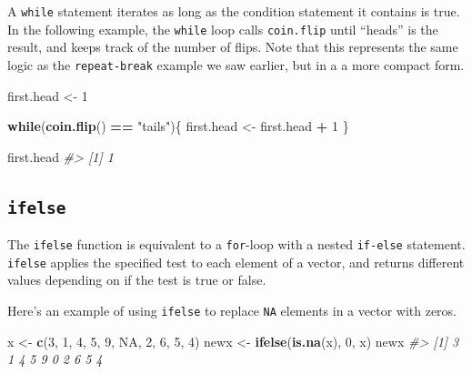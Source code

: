\documentclass[]{book}
\newenvironment{Shaded}{\begin{snugshade}}{\end{snugshade}}
\newcommand{\CommentTok}[1]{\textcolor[rgb]{0.56,0.35,0.01}{\textit{#1}}}
\newcommand{\ControlFlowTok}[1]{\textcolor[rgb]{0.13,0.29,0.53}{\textbf{#1}}}
\newcommand{\DecValTok}[1]{\textcolor[rgb]{0.00,0.00,0.81}{#1}}
\newcommand{\KeywordTok}[1]{\textcolor[rgb]{0.13,0.29,0.53}{\textbf{#1}}}
\newcommand{\NormalTok}[1]{#1}
\newcommand{\OperatorTok}[1]{\textcolor[rgb]{0.81,0.36,0.00}{\textbf{#1}}}
\newcommand{\OtherTok}[1]{\textcolor[rgb]{0.56,0.35,0.01}{#1}}
\newcommand{\StringTok}[1]{\textcolor[rgb]{0.31,0.60,0.02}{#1}}
\theoremstyle{definition}
\theoremstyle{definition}
\theoremstyle{definition}
\theoremstyle{remark}
\begin{document}
A \texttt{while} statement iterates as long as the condition statement
it contains is true. In the following example, the \texttt{while} loop
calls \texttt{coin.flip} until ``heads'' is the result, and keeps track
of the number of flips. Note that this represents the same logic as the
\texttt{repeat-break} example we saw earlier, but in a a more compact
form.

\begin{Shaded}
\begin{Highlighting}[]
\NormalTok{first.head <-}\StringTok{ }\DecValTok{1}

\ControlFlowTok{while}\NormalTok{(}\KeywordTok{coin.flip}\NormalTok{() }\OperatorTok{==}\StringTok{ "tails"}\NormalTok{)\{}
\NormalTok{  first.head <-}\StringTok{ }\NormalTok{first.head }\OperatorTok{+}\StringTok{ }\DecValTok{1}
\NormalTok{\}}

\NormalTok{first.head}
\CommentTok{#> [1] 1}
\end{Highlighting}
\end{Shaded}

\hypertarget{ifelse}{%
\subsection{\texorpdfstring{\texttt{ifelse}}{ifelse}}\label{ifelse}}

The \texttt{ifelse} function is equivalent to a \texttt{for}-loop with a
nested \texttt{if-else} statement. \texttt{ifelse} applies the specified
test to each element of a vector, and returns different values depending
on if the test is true or false.

Here's an example of using \texttt{ifelse} to replace \texttt{NA}
elements in a vector with zeros.

\begin{Shaded}
\begin{Highlighting}[]
\NormalTok{x <-}\StringTok{ }\KeywordTok{c}\NormalTok{(}\DecValTok{3}\NormalTok{, }\DecValTok{1}\NormalTok{, }\DecValTok{4}\NormalTok{, }\DecValTok{5}\NormalTok{, }\DecValTok{9}\NormalTok{, }\OtherTok{NA}\NormalTok{, }\DecValTok{2}\NormalTok{, }\DecValTok{6}\NormalTok{, }\DecValTok{5}\NormalTok{, }\DecValTok{4}\NormalTok{)}
\NormalTok{newx <-}\StringTok{ }\KeywordTok{ifelse}\NormalTok{(}\KeywordTok{is.na}\NormalTok{(x), }\DecValTok{0}\NormalTok{, x)}
\NormalTok{newx}
\CommentTok{#>  [1] 3 1 4 5 9 0 2 6 5 4}
\end{Highlighting}
\end{Shaded}
\end{document}
